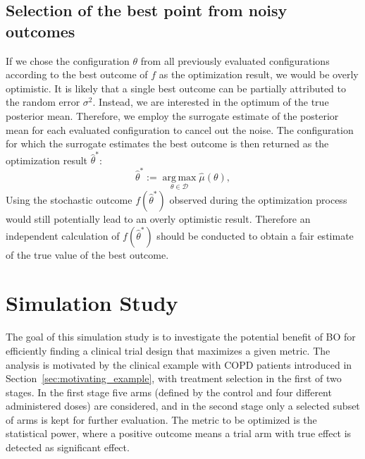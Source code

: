 \documentclass[bimj,fleqn]{w-art}
\theoremstyle{plain}
\theoremstyle{definition}
\begin{document}
\subsection{Selection of the best point from noisy outcomes}
\label{ssec:best_point}
If we chose the configuration $\theta$ from all previously evaluated configurations according to the best outcome of $f$ as the optimization result, we would be overly optimistic.
It is likely that a single best outcome can be partially attributed to the random error $\sigma^2$.
Instead, we are interested in the optimum of the true posterior mean.
Therefore, we employ the surrogate estimate of the posterior mean for each evaluated configuration to cancel out the noise.
The configuration for which the surrogate estimates the best outcome is then returned as the optimization result $\hat{\theta}^\ast$:
\begin{equation}
  \hat{\theta}^{\ast} := \operatorname{arg\,max}\limits_{\theta \in \mathcal{D}} \hat{\mu}(\theta),
\end{equation}
Using the stochastic outcome $f(\hat{\theta}^\ast) $ observed during the optimization process would still potentially lead to an overly optimistic result.
Therefore an independent calculation of $f(\hat{\theta}^\ast)$ should be conducted to obtain a fair estimate of the true value of the best outcome.

\section{Simulation Study}
\label{sec:simulation_study}

The goal of this simulation study is to investigate the potential benefit of BO for efficiently finding a clinical trial design that maximizes a given metric.
The analysis is motivated by the clinical example with COPD patients introduced in Section~\ref{sec:motivating_example}, with treatment selection in the first of two stages.
In the first stage five arms (defined by the control and four different administered doses) are considered, and in the second stage only a selected subset of arms is kept for further evaluation. 
The metric to be optimized is the statistical power, where a positive outcome means a trial arm with true effect is detected as significant effect.
\end{document}
